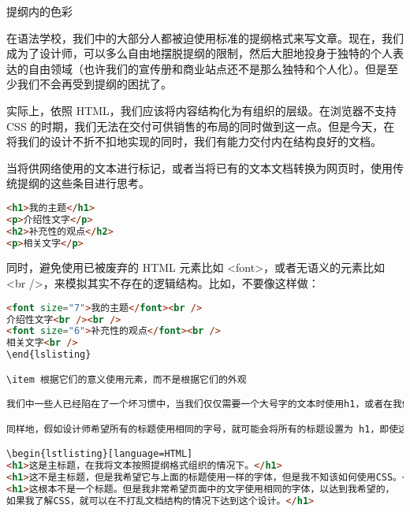 \begin{compactenum}
\item 提纲内的色彩

在语法学校，我们中的大部分人都被迫使用标准的提纲格式来写文章。现在，我们成为了设计师，可以多么自由地摆脱提纲的限制，然后大胆地投身于独特的个人表达的自由领域（也许我们的宣传册和商业站点还不是那么独特和个人化）。但是至少我们不会再受到提纲的困扰了。

实际上，依照 HTML，我们应该将内容结构化为有组织的层级。在浏览器不支持 CSS 的时期，我们无法在交付可供销售的布局的同时做到这一点。但是今天，在将我们的设计不折不扣地实现的同时，我们有能力交付内在结构良好的文档。

当将供网络使用的文本进行标记，或者当将已有的文本文档转换为网页时，使用传统提纲的这些条目进行思考。

\begin{lstlisting}[language=HTML]
<h1>我的主题</h1>
<p>介绍性文字</p>
<h2>补充性的观点</h2>
<p>相关文字</p>
\end{lstlisting}

同时，避免使用已被废弃的 HTML 元素比如 <font>，或者无语义的元素比如 <br />，来模拟其实不存在的逻辑结构。比如，不要像这样做：

\begin{lstlisting}[language=HTML]
<font size="7">我的主题</font><br />
介绍性文字<br /><br />
<font size="6">补充性的观点</font><br />
相关文字<br />
\end{lslisting}

\item 根据它们的意义使用元素，而不是根据它们的外观

我们中一些人已经陷在了一个坏习惯中，当我们仅仅需要一个大号字的文本时使用h1，或者在我们需要在前面加一个圆点符号时使用 li，而且浏览器一直都习惯于将设计属性强加于 HTML 元素之上。我们都一直习惯于认为，h1 意味着大号字，而li意味着圆点，或者 blockquote 意味着文本缩进。我们中的大多数人还在使用结构化元素模拟表现效果的方式来胡乱地写作 HTML。

同样地，假如设计师希望所有的标题使用相同的字号，就可能会将所有的标题设置为 h1，即使这么做毫无结构化语义可言。

\begin{lstlisting}[language=HTML]
<h1>这是主标题，在我将文本按照提纲格式组织的情况下。</h1>
<h1>这不是主标题，但是我希望它与上面的标题使用一样的字体，但是我不知该如何使用CSS。</h1>
<h1>这根本不是一个标题。但是我非常希望页面中的文字使用相同的字体，以达到我希望的，
如果我了解CSS，就可以在不打乱文档结构的情况下达到这个设计。</h1>
\end{lstlisting}


\end{compactenum}
